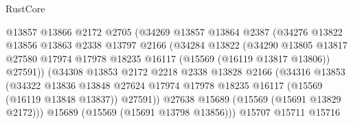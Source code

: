 \begin{lexlean}{RustCore}
\begin{coremodule}
                                  @13857
                                  @13866
                                  @2172
                                  @2705
                                  (@34269
                                    @13857
                                    @13864
                                    @2387
                                    (@34276
                                      @13822
                                      @13856
                                      @13863
                                      @2338
                                      @13797
                                      @2166
                                      (@34284
                                        @13822
                                        (@34290
                                          @13805
                                          @13817
                                          @27580
                                          @17974
                                          @17978
                                          @18235
                                          @16117
                                          (@15569 (@16119 @13817 @13806))
                                          @27591))
                                      (@34308
                                        @13853
                                        @2172
                                        @2218
                                        @2338
                                        @13828
                                        @2166
                                        (@34316
                                          @13853
                                          (@34322
                                            @13836
                                            @13848
                                            @27624
                                            @17974
                                            @17978
                                            @18235
                                            @16117
                                            (@15569 (@16119 @13848 @13837))
                                            @27591))
                                        @27638
                                        @15689
                                        (@15569 (@15691 @13829 @2172)))
                                      @15689
                                      (@15569 (@15691 @13798 @13856)))
                                    @15707
                                    @15711
                                    @15716

\end{coremodule}
\end{lexlean}
